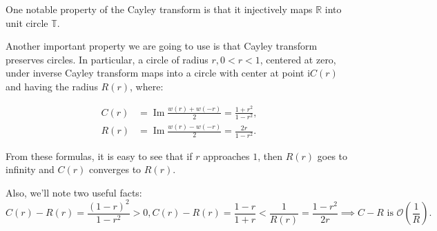 \documentclass{birkjour}
\theoremstyle{definition}
\theoremstyle{remark}
\numberwithin{equation}{section}
\begin{document}
One notable property of the Cayley transform  is that it
injectively maps $\mathbb{R}$ into unit circle $\mathbb{T}$.

Another important property  we are going to use is that Cayley
transform preserves circles. In particular, a circle of radius $r,
0 < r < 1$, centered at zero, under inverse Cayley transform maps
into a circle with center at point $\mathrm{i} C(r)$ and having
the radius $R(r)$, where:

\begin{equation}\label{eq:c_and_r}
\begin{aligned}
   C(r) &= \operatorname{Im} \frac{w(r) + w(-r)}{2} =
   \frac{1 + r^2}{1 - r^2},
\\ R(r) &= \operatorname{Im} \frac{w(r) - w(-r)}{2} =
\frac{2 r}{1 - r^2}.
\end{aligned}
\end{equation}

From these formulas,  it is easy to see that if $r$ approaches
$1$, then $R(r)$ goes to infinity and $C(r)$ converges to $R(r)$.

Also, we'll note two useful facts:
\begin{subequations}
\begin{equation}
C(r) - R(r) = \frac{(1 - r)^2}{1 - r^2} > 0,
\label{eq:cr_positive}
\end{equation}
\begin{equation}
C(r) - R(r) = \frac{1 - r}{1 + r} < \frac{1}{R(r)} = \frac{1 -
r^2}{2 r} \implies C - R \text{\ is\ }
\mathcal{O}\left(\frac{1}{R}\right).
\label{eq:cr_small}
\end{equation}
\end{subequations}
\end{document}
